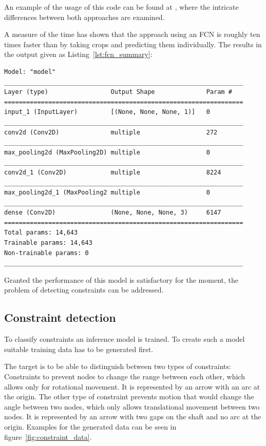 An example of the usage of this code can be found at , where the intricate differences between both approaches are examined.

A measure of the time has shown that the approach using an FCN is roughly ten times faster than by taking crops and predicting them individually. 
The  results in the output given as Listing~\ref{lst:fcn_summary}:

\begin{lstlisting}[label={lst:fcn_summary}, caption={Summary of Symbol Classifier transformed into a FCN.}]
Model: "model"
_________________________________________________________________
Layer (type)                 Output Shape              Param #   
=================================================================
input_1 (InputLayer)         [(None, None, None, 1)]   0         
_________________________________________________________________
conv2d (Conv2D)              multiple                  272       
_________________________________________________________________
max_pooling2d (MaxPooling2D) multiple                  0         
_________________________________________________________________
conv2d_1 (Conv2D)            multiple                  8224      
_________________________________________________________________
max_pooling2d_1 (MaxPooling2 multiple                  0         
_________________________________________________________________
dense (Conv2D)               (None, None, None, 3)     6147      
=================================================================
Total params: 14,643
Trainable params: 14,643
Non-trainable params: 0
_________________________________________________________________
\end{lstlisting}

Granted the performance of this model is satisfactory for the moment, the problem of detecting constraints can be addressed.

\subsection{Constraint detection}

To classify constraints an inference model is trained.
To create such a model suitable training data has to be generated first.

The target is to be able to distinguish between two types of constraints:
Constraints to prevent nodes to change the range between each other, which allows only for rotational movement.
It is represented by an arrow with an arc at the origin.
The other type of constraint prevents motion that would change the angle between two nodes, which only allows translational movement between two nodes.
It is represented by an arrow with two gaps on the shaft and no arc at the origin.
Examples for the generated data can be seen in figure~\ref{fig:constraint_data}.

